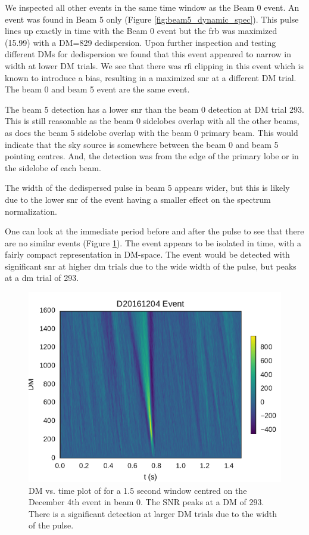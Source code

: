 \documentclass[a4paper,fleqn,usenatbib]{mnras}
\begin{document}
We inspected all other events in the same time window as the Beam 0 event. An
event was found in Beam 5 only (Figure \ref{fig:beam5_dynamic_spec}). This pulse
lines up exactly in time with the Beam 0 event but the \gls{frb} was maximized
(15.99) with a DM=829 dedispersion. Upon further inspection and testing
different DMs for dedispersion we found that this event appeared to narrow in
width at lower DM trials. We see that there was \gls{rfi} clipping in this event
which is known to introduce a bias, resulting in a maximized \gls{snr} at a
different DM trial. The beam 0 and beam 5 event are the same event.

The beam 5 detection has a lower \gls{snr} than the beam 0 detection at DM trial
293. This is still reasonable as the beam 0 sidelobes overlap with all the other
beams, as does the beam 5 sidelobe overlap with the beam 0 primary beam. This
would indicate that the sky source is somewhere between the beam 0 and beam 5
pointing centres. And, the detection was from the edge of the primary lobe or in
the sidelobe of each beam.

The width of the dedispersed pulse in beam 5 appears wider, but this is likely
due to the lower \gls{snr} of the event having a smaller effect on the
spectrum normalization.

One can look at the immediate period before and after the pulse to see that
there are no similar events (Figure \ref{fig:dm_time}). The event appears to be
isolated in time, with a fairly compact representation in DM-space. The event
would be detected with significant \gls{snr} at higher \gls{dm} trials due to
the wide width of the pulse, but peaks at a \gls{dm} trial of 293.

\begin{figure}
    \includegraphics[width=1.0\linewidth]{figures/D20161204_dmtrials_buf23_Beam0.pdf}
    \caption{DM vs. time plot of for a 1.5 second window centred on the December
    4th event in beam 0. The SNR peaks at a DM of 293. There is a significant
    detection at larger DM trials due to the width of the pulse.
    }
    \label{fig:dm_time}
\end{figure}
%
\end{document}
